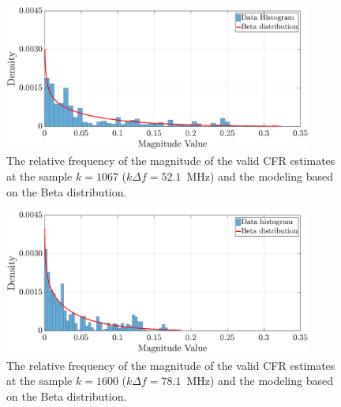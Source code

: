 \begin{figure}[h!]
	\centering
	\includegraphics[width=0.9\textwidth]{images/Mag_hist_2.eps}
	\caption{The relative frequency of the magnitude of the valid CFR estimates at the sample $k = 1067$ ($k\Delta f= 52.1$~MHz) and the modeling based on the Beta distribution.}
	\label{mag_example}
\end{figure}

\begin{figure}[h!]
	\centering
	\includegraphics[width=0.9\textwidth]{images/Mag_hist2_2.eps}
	\caption{ The relative frequency of the magnitude of the valid CFR estimates at the sample $k = 1600$ ($k\Delta f= 78.1$~MHz) and the modeling based on the Beta distribution.}
	\label{mag_example2}
\end{figure}

